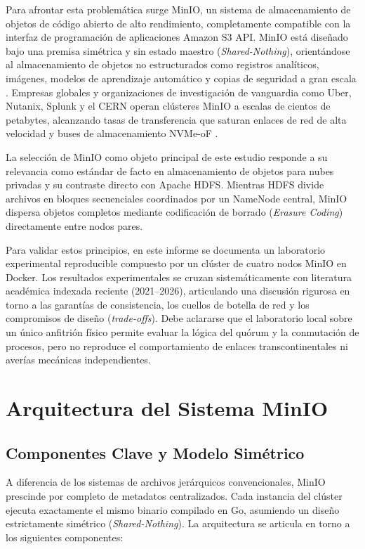 \documentclass[12pt,a4paper]{article}
\begin{document}
Para afrontar esta problemática surge MinIO, un sistema de almacenamiento de objetos de código abierto de alto rendimiento, completamente compatible con la interfaz de programación de aplicaciones Amazon S3 API. MinIO está diseñado bajo una premisa simétrica y sin estado maestro (\emph{Shared-Nothing}), orientándose al almacenamiento de objetos no estructurados como registros analíticos, imágenes, modelos de aprendizaje automático y copias de seguridad a gran escala \cite{gadban2021s3hpc}. Empresas globales y organizaciones de investigación de vanguardia como Uber, Nutanix, Splunk y el CERN operan clústeres MinIO a escalas de cientos de petabytes, alcanzando tasas de transferencia que saturan enlaces de red de alta velocidad y buses de almacenamiento NVMe-oF \cite{han2025rdio,mehmood20255gminio}.

La selección de MinIO como objeto principal de este estudio responde a su relevancia como estándar de facto en almacenamiento de objetos para nubes privadas y su contraste directo con Apache HDFS. Mientras HDFS divide archivos en bloques secuenciales coordinados por un NameNode central, MinIO dispersa objetos completos mediante codificación de borrado (\emph{Erasure Coding}) directamente entre nodos pares. 

Para validar estos principios, en este informe se documenta un laboratorio experimental reproducible compuesto por un clúster de cuatro nodos MinIO en Docker. Los resultados experimentales se cruzan sistemáticamente con literatura académica indexada reciente (2021--2026), articulando una discusión rigurosa en torno a las garantías de consistencia, los cuellos de botella de red y los compromisos de diseño (\emph{trade-offs}). Debe aclararse que el laboratorio local sobre un único anfitrión físico permite evaluar la lógica del quórum y la conmutación de procesos, pero no reproduce el comportamiento de enlaces transcontinentales ni averías mecánicas independientes.

\section{Arquitectura del Sistema MinIO}

\subsection{Componentes Clave y Modelo Simétrico}
A diferencia de los sistemas de archivos jerárquicos convencionales, MinIO prescinde por completo de metadatos centralizados. Cada instancia del clúster ejecuta exactamente el mismo binario compilado en Go, asumiendo un diseño estrictamente simétrico (\emph{Shared-Nothing}). La arquitectura se articula en torno a los siguientes componentes:
\end{document}
